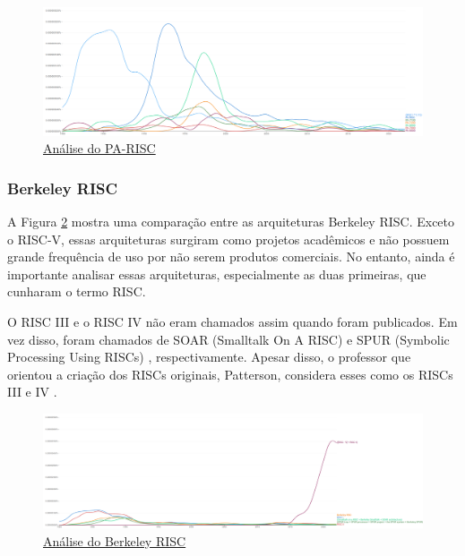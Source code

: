 \documentclass[
	article,			%
	11pt,				%
	oneside,			%
	a4paper,			%
	english,			%
	brazil,				%
	sumario=tradicional
	]{abntex2}
\begin{document}
\begin{figure}[h]
    \centering
    \includegraphics[width=1\linewidth]{Ngrams/PA_RISC.png}
    \caption{{\href{https://books.google.com/ngrams/graph?content=PA\%20RISC\%2CPA\%207000\%2CPA\%207100\%2CPA\%207200\%2CPA\%208000\%2CPA\%208500\%2C\%28RISC\%20I\%20\%2A\%200.15\%29&year_start=1980&year_end=2022&corpus=en&smoothing=1}{Análise do PA-RISC}}}
    \label{fig:NgramPA-RISC}
\end{figure}

\subsubsection{Berkeley RISC}

A Figura \ref{fig:NgramBerkeleyRISC} mostra uma comparação entre as arquiteturas Berkeley RISC. Exceto o RISC-V, essas arquiteturas surgiram como projetos acadêmicos e não possuem grande frequência de uso por não serem produtos comerciais. No entanto, ainda é importante analisar essas arquiteturas, especialmente as duas primeiras, que cunharam o termo RISC.

O RISC III e o RISC IV não eram chamados assim quando foram publicados. Em vez disso, foram chamados de SOAR (Smalltalk On A RISC) \cite{samples_soar_1985} e SPUR (Symbolic Processing Using RISCs) \cite{hill_spur_1985}, respectivamente. Apesar disso, o professor que orientou a criação dos RISCs originais, Patterson, considera esses como os RISCs III e IV \cite{patterson_risc-v_2016}.


\begin{figure}[h]
    \centering
    \includegraphics[width=1\linewidth]{Ngrams/Berkeley_RISC.png}
    \caption{\href{https://books.google.com/ngrams/graph?content=RISC\%20I\%2CRISC\%20II\%2CSPUR\%20Lisp\%20\%2B\%20SPUR\%20processor\%20\%2B\%20SPUR\%20project\%20\%2B\%20the\%20SPUR\%20system\%2BBerkeley\%20SPUR\%2CBerkeley\%20RISC\%2CSmalltalk\%20on\%20a\%20RISC\%20\%2B\%20Berkeley\%20Smalltalk\%20\%2B\%20SOAR\%20architecture\%2C\%5BRISC-V\%5D\%20\%2B\%20RISC\%20V&year_start=1980&year_end=2022&corpus=en&smoothing=1&case_insensitive=true}{Análise do Berkeley RISC}}
    \label{fig:NgramBerkeleyRISC}
\end{figure}
\end{document}
